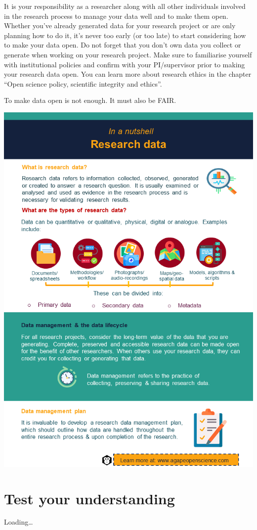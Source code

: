 \documentclass[
]{book}
\begin{document}
It is your responsibility as a researcher along with all other individuals involved in the research process to manage your data well and to make them open. Whether you've already generated data for your research project or are only planning how to do it, it's never too early (or too late) to start considering how to make your data open. Do not forget that you don't own data you collect or generate when working on your research project. Make sure to familiarise yourself with institutional policies and confirm with your PI/supervisor prior to making your research data open. You can learn more about research ethics in the chapter ``Open science policy, scientific integrity and ethics''.

To make data open is not enough. It must also be FAIR.

\begin{center}\includegraphics[width=0.7\linewidth]{images/slide5} \end{center}

\hypertarget{test-your-understanding-3}{%
\section{Test your understanding}\label{test-your-understanding-3}}

Loading\ldots{}
\end{document}
